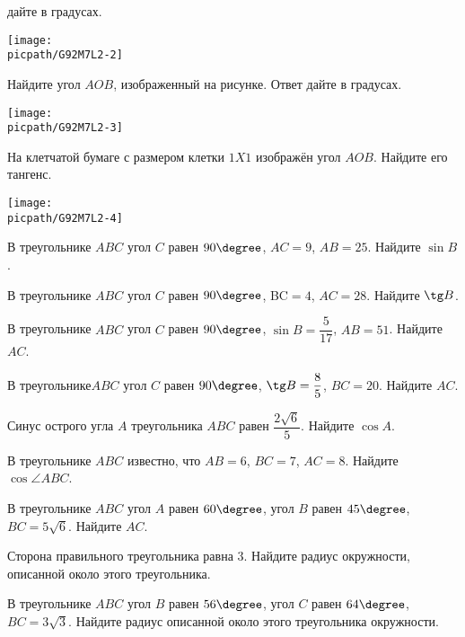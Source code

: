 \begin{class}[number=2]
\begin{listofex}
		дайте в градусах.
		\begin{center}
			\texttt{[image: \\picpath/G92M7L2-2]}
		\end{center}
		\item Найдите угол \( AOB \), изображенный на рисунке. Ответ дайте в градусах.
		\begin{center}
			\texttt{[image: \\picpath/G92M7L2-3]}
		\end{center}
		\item На клетчатой бумаге с размером клетки \( 1X1 \) изображён угол \( AOB \). Найдите его тангенс.
		\begin{center}
			\texttt{[image: \\picpath/G92M7L2-4]}
		\end{center}
	\end{listofex}
\end{class}

\begin{homework}[number=1]
	\begin{listofex}
		\item В треугольнике \( ABC \) угол \( C \) равен \( 90\degree \), \( AC=9 \), \( AB=25 \). Найдите \( \sin B \).
		\item В треугольнике \( ABC \) угол \( C \) равен \( 90\degree \), BC\( =4 \), \( AC=28 \). Найдите \( \tg B \).
		\item В треугольнике \( ABC \) угол \( C \) равен \( 90\degree \), \( \sin B=\dfrac{5}{17} \), \( AB=51 \). Найдите \( AC \).
		\item В треугольнике\( ABC \) угол \( C \) равен \( 90\degree \), \( \tg B=\dfrac{8}{5} \), \( BC=20 \). Найдите \( AC \).
		\item Синус острого угла \( A \) треугольника \( ABC \) равен \( \dfrac{2\sqrt{6}}{5} \). Найдите \( \cos A \).
		\item В треугольнике \( ABC \) известно, что \( AB=6 \), \( BC=7 \), \( AC=8 \). Найдите \( \cos\angle ABC \).
		\item В треугольнике \( ABC \) угол \( A \) равен \( 60\degree \), угол \( B \) равен \( 45\degree \), \( BC=5\sqrt{6} \). Найдите \( AC \).
		\item Сторона правильного треугольника равна \( 3 \). Найдите радиус окружности, описанной около этого треугольника.
		\item В треугольнике \( ABC \) угол \( B \) равен \( 56\degree \), угол \( C \) равен \( 64\degree \), \( BC=3\sqrt{3} \). Найдите радиус описанной около этого треугольника окружности.
	\end{listofex}
\end{homework}

